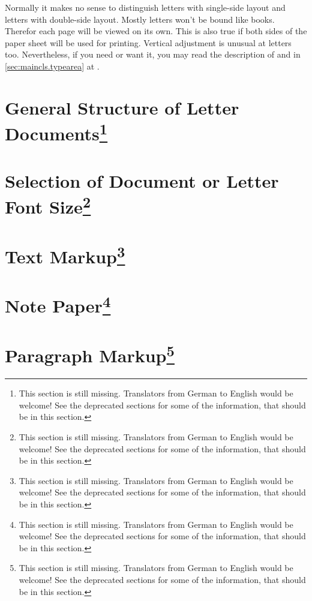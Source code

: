 Normally it makes no sense to distinguish letters with single-side layout and
letters with double-side layout. Mostly letters won't be bound like
books. Therefor each page will be viewed on its own. This is also true if both
sides of the paper sheet will be used for printing. Vertical adjustment is
unusual at letters too. Nevertheless, if you need or want it, you may read the
description of  and  in
\autoref{sec:maincls.typearea} at .%
%


\section{General Structure of Letter Documents\protect\footnote{This section is still missing. Translators
    from German to English would be welcome! See the deprecated sections for
    some of the information, that should be in this section.}}
\label{sec:scrlttr2.stillmissing}
\mbox{}

\section{Selection of Document or Letter Font Size\protect\footnote{This section is still missing. Translators
    from German to English would be welcome! See the deprecated sections for
    some of the information, that should be in this section.}}
\label{sec:scrlttr2.stillmissing}
\mbox{}

\section{Text Markup\protect\footnote{This section is still missing. Translators
    from German to English would be welcome! See the deprecated sections for
    some of the information, that should be in this section.}}
\label{sec:scrlttr2.stillmissing}
\mbox{}

\section{Note Paper\protect\footnote{This section is still missing. Translators
    from German to English would be welcome! See the deprecated sections for
    some of the information, that should be in this section.}}
\label{sec:scrlttr2.stillmissing}
\mbox{}

\section{Paragraph Markup\protect\footnote{This section is still missing. Translators
    from German to English would be welcome! See the deprecated sections for
    some of the information, that should be in this section.}}
\label{sec:scrlttr2.stillmissing}
\mbox{}

